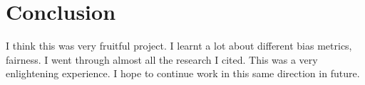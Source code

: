 \documentclass{article}
\begin{document}
\section{Conclusion}

I think this was very fruitful project. I learnt a lot about different bias metrics, fairness. I went through almost all the research I cited. This was a very enlightening experience. I hope to continue work in this same direction in future.


\begin{acks}
\end{acks}






\end{document}
